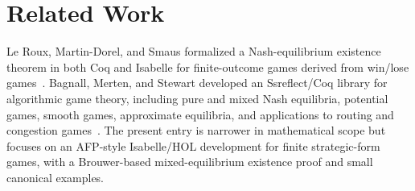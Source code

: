 \documentclass[11pt,a4paper]{article}
\begin{document}
\section*{Related Work}

Le Roux, Martin-Dorel, and Smaus formalized a Nash-equilibrium existence theorem
in both Coq and Isabelle for finite-outcome games derived from win/lose
games~\cite{LeRouxMartinDorelSmaus2017}.  Bagnall, Merten, and Stewart
developed an Ssreflect/Coq library for algorithmic game theory, including pure
and mixed Nash equilibria, potential games, smooth games, approximate
equilibria, and applications to routing and congestion games~\cite{BagnallMertenStewart2017}.
The present entry is narrower in mathematical scope but focuses on an
AFP-style Isabelle/HOL development for finite strategic-form games, with a
Brouwer-based mixed-equilibrium existence proof and small canonical examples.

\tableofcontents
\newpage





\end{document}
